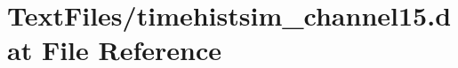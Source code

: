 \hypertarget{TextFiles_2timehistsim__channel15_8dat}{}\section{Text\+Files/timehistsim\+\_\+channel15.dat File Reference}
\label{TextFiles_2timehistsim__channel15_8dat}
